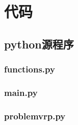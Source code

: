 \documentclass{whutmod}
\begin{document}
\section{代码}
\subsection{python源程序}
\subsubsection{functions.py}

\subsubsection{main.py}

\subsubsection{problemvrp.py}

\end{document}

